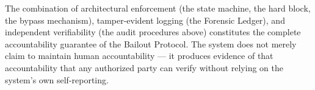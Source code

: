The combination of architectural enforcement (the state machine, the hard block, the bypass mechanism), tamper-evident logging (the Forensic Ledger), and independent verifiability (the audit procedures above) constitutes the complete accountability guarantee of the Bailout Protocol. The system does not merely claim to maintain human accountability — it produces evidence of that accountability that any authorized party can verify without relying on the system's own self-reporting.

